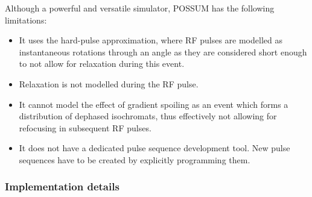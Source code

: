Although a powerful and versatile simulator, POSSUM has the following limitations:
\begin{itemize}
    
    \item It uses the hard-pulse approximation, where RF pulses are modelled as instantaneous rotations through an angle as they are considered short enough to not allow for relaxation during this event. 
    
    \item Relaxation is not modelled during the RF pulse.
    
    \item It cannot model the effect of gradient spoiling as an event which forms a distribution of dephased isochromats, thus effectively not allowing for refocusing in subsequent RF pulses.
    
    \item It does not have a dedicated pulse sequence development tool. New pulse sequences have to be created by explicitly programming them.
    
\end{itemize}

\hfill

\subsubsection{Implementation details}

